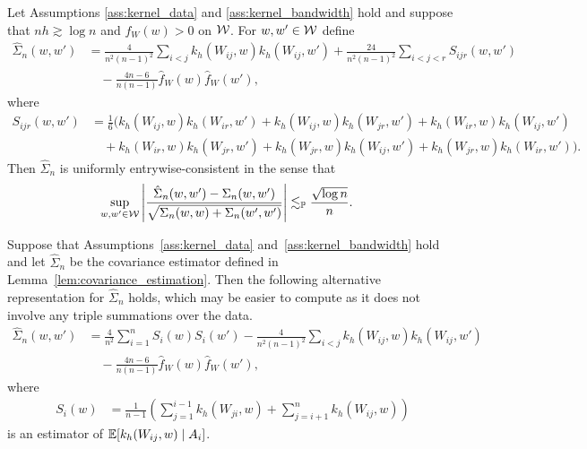 \begin{lemma}
  \label{lem:covariance_estimation}

  Let Assumptions \ref{ass:kernel_data} and \ref{ass:kernel_bandwidth}
  hold and suppose that $n h \gtrsim \log n$
  and $f_W(w) > 0$ on $\mathcal{W}$.
  For $w,w' \in \mathcal{W}$ define
  \begin{align*}
    \hat \Sigma_n(w,w')
    &=
    \frac{4}{n^2(n-1)^2}
    \sum_{i<j}
    k_h(W_{i j},w)
    k_h(W_{i j},w')
    +
    \frac{24}{n^2(n-1)^2}
    \sum_{i<j<r}
    S_{i j r}(w,w') \\
    &\quad-
    \frac{4n-6}{n(n-1)}
    \hat f_W(w)
    \hat f_W(w'),
  \end{align*}
  where
  \begin{align*}
    S_{i j r}(w,w')
    &=
    \frac{1}{6}
    \Big(
      k_h(W_{i j},w)
      k_h(W_{i r},w')
      + k_h(W_{i j},w)
      k_h(W_{jr},w')
      + k_h(W_{i r},w)
      k_h(W_{i j},w') \\
      &\quad+
      k_h(W_{i r},w)
      k_h(W_{jr},w')
      + k_h(W_{jr},w)
      k_h(W_{i j},w')
      + k_h(W_{jr},w)
      k_h(W_{i r},w')
    \Big).
  \end{align*}
  Then $\hat \Sigma_n$
  is uniformly entrywise-consistent in the sense that
  \begin{align*}
    \sup_{w,w' \in \mathcal{W}}
    \left|
    \frac{\hat \Sigma_n(w,w') - \Sigma_n(w,w')}
    {\sqrt{\Sigma_n(w,w) + \Sigma_n(w',w')}}
    \right|
    &\lesssim_{\mathbb{P}}
    \frac{\sqrt{\log n}}{n}.
  \end{align*}

\end{lemma}

\begin{lemma}
  \label{lem:alternative_covariance_estimator}

  Suppose that Assumptions~\ref{ass:kernel_data}
  and~\ref{ass:kernel_bandwidth} hold
  and let $\hat \Sigma_n$
  be the covariance estimator defined
  in Lemma~\ref{lem:covariance_estimation}.
  Then the following alternative representation
  for $\hat \Sigma_n$ holds,
  which may be easier to compute
  as it does not involve any triple summations
  over the data.
  \begin{align*}
    \hat \Sigma_n(w,w')
    &=
    \frac{4}{n^2}
    \sum_{i=1}^n
    S_i(w) S_i(w')
    - \frac{4}{n^2(n-1)^2}
    \sum_{i<j}
    k_h(W_{i j},w)
    k_h(W_{i j},w') \\
    &\quad-
    \frac{4n-6}{n(n-1)}
    \hat f_W(w)
    \hat f_W(w'),
  \end{align*}
  where
  \begin{align*}
    S_i(w)
    &=
    \frac{1}{n-1}
    \left(
      \sum_{j = 1}^{i-1}
      k_h(W_{j i}, w)
      + \sum_{j = i+1}^n
      k_h(W_{i j}, w)
    \right)
  \end{align*}
  is an estimator of
  $\mathbb{E}[k_h(W_{i j},w) \mid A_i]$.

\end{lemma}

